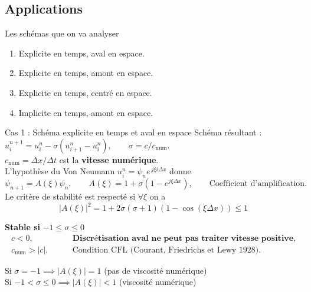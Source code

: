 \documentclass[aspectratio=169, french]{beamer}
\begin{document}
\subsection{Applications}

\begin{frame}{Les schémas que on va analyser}
\begin{enumerate}
	\item Explicite en temps, aval en espace.
	\item Explicite en temps, amont en espace.
	\item Explicite en temps, centré en espace.
	\item Implicite en temps, amont en espace.
\end{enumerate} 
\end{frame}


\begin{frame}{Cas 1 : Schéma explicite en temps et aval en espace}
Schéma résultant : 
$u_{i}^{n+1} = u_{i}^n - \sigma(u_{i+1}^n - u_{i}^{n}), \qquad \sigma = c/c_{\mathrm{num}}$. \\ $c_{\mathrm{num}} = \Delta x/\Delta t$ est la \textbf{vitesse numérique}. \\
L'hypothèse du Von Neumann $u_{i}^{n} = \psi_n e^{\, j  \xi  i  \Delta x}$ donne 
\begin{equation*}
\psi_{n+1} = A(\xi) \psi_n, \qquad	A(\xi) = 1 + \sigma(1 - e^{j  \xi \Delta x}), \qquad \text{Coefficient d'amplification}.
\end{equation*}
Le critère de stabilité est respecté si $\forall \xi$ on a
\begin{equation*}
	|A(\xi)|^2 = 1 + 2 \sigma(\sigma + 1)(1 - \cos(\xi \Delta x))\le 1   
\end{equation*}
\begin{tcolorbox}[title=Conditions de stabilité, coltitle=white]
		 \textbf{Stable si } $-1 \le \sigma \le 0$
\begin{equation*}
	\begin{aligned}
		c<0, \\
		c_{\mathrm{num}}>|c|, 
	\end{aligned}
	\qquad 
	\begin{aligned}
		\textbf{Discrétisation aval ne peut pas traiter vitesse positive}, \\
		\text{Condition CFL (Courant, Friedrichs et Lewy 1928).}
	\end{aligned}
\end{equation*}

\end{tcolorbox}

Si $\sigma=-1 \implies |A(\xi)|=1$ \hspace{.5cm} (pas de viscosité numérique)\\
Si $-1 < \sigma \le 0 \implies |A(\xi)|<1$ \hspace{.5cm} (viscosité numérique)

\end{frame}
\end{document}
